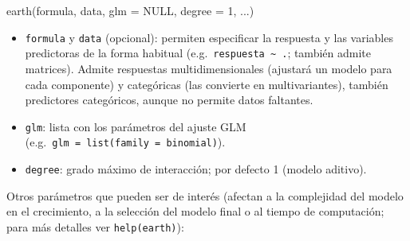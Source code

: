 \documentclass[
]{book}
\newenvironment{Shaded}{\begin{snugshade}}{\end{snugshade}}
\newcommand{\AttributeTok}[1]{\textcolor[rgb]{0.77,0.63,0.00}{#1}}
\newcommand{\ConstantTok}[1]{\textcolor[rgb]{0.00,0.00,0.00}{#1}}
\newcommand{\DecValTok}[1]{\textcolor[rgb]{0.00,0.00,0.81}{#1}}
\newcommand{\FunctionTok}[1]{\textcolor[rgb]{0.00,0.00,0.00}{#1}}
\newcommand{\NormalTok}[1]{#1}
\theoremstyle{break}
\theoremstyle{definition}
\theoremstyle{definition}
\theoremstyle{definition}
\theoremstyle{definition}
\theoremstyle{remark}
\begin{document}
\begin{Shaded}
\begin{Highlighting}[]
\FunctionTok{earth}\NormalTok{(formula, data, }\AttributeTok{glm =} \ConstantTok{NULL}\NormalTok{, }\AttributeTok{degree =} \DecValTok{1}\NormalTok{, ...) }
\end{Highlighting}
\end{Shaded}

\begin{itemize}
\item
  \texttt{formula} y \texttt{data} (opcional): permiten especificar la respuesta y las variables predictoras de la forma habitual (e.g.~\texttt{respuesta\ \textasciitilde{}\ .}; también admite matrices). Admite respuestas multidimensionales (ajustará un modelo para cada componente) y categóricas (las convierte en multivariantes), también predictores categóricos, aunque no permite datos faltantes.
\item
  \texttt{glm}: lista con los parámetros del ajuste GLM (e.g.~\texttt{glm\ =\ list(family\ =\ binomial)}).
\item
  \texttt{degree}: grado máximo de interacción; por defecto 1 (modelo aditivo).
\end{itemize}

Otros parámetros que pueden ser de interés (afectan a la complejidad del modelo en el crecimiento, a la selección del modelo final o al tiempo de computación; para más detalles ver \texttt{help(earth)}):
\end{document}
